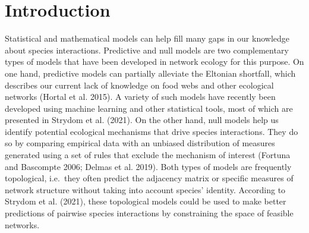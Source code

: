 \documentclass[11pt]{article}
\begin{document}
\clearpage
\linenumbers
\pagestyle{normal}

\hypertarget{introduction}{%
\section{Introduction}\label{introduction}}

Statistical and mathematical models can help fill many gaps in our
knowledge about species interactions. Predictive and null models are two
complementary types of models that have been developed in network
ecology for this purpose. On one hand, predictive models can partially
alleviate the Eltonian shortfall, which describes our current lack of
knowledge on food webs and other ecological networks (Hortal et al.
2015). A variety of such models have recently been developed using
machine learning and other statistical tools, most of which are
presented in Strydom et al. (2021). On the other hand, null models help
us identify potential ecological mechanisms that drive species
interactions. They do so by comparing empirical data with an unbiased
distribution of measures generated using a set of rules that exclude the
mechanism of interest (Fortuna and Bascompte 2006; Delmas et al. 2019).
Both types of models are frequently topological, i.e.~they often predict
the adjacency matrix or specific measures of network structure without
taking into account species' identity. According to Strydom et al.
(2021), these topological models could be used to make better
predictions of pairwise species interactions by constraining the space
of feasible networks.
\end{document}
